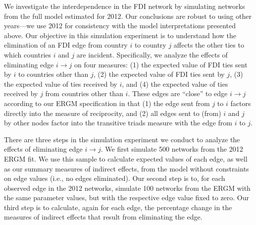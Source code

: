 \documentclass[reqno,onecolumn,letterpaper,12pt]{article}
\begin{document}
We investigate the interdependence in the FDI network by simulating networks from the full model estimated for 2012. Our conclusions are robust to using other years---we use 2012 for consistency with the model interpretations presented above. Our objective in this simulation experiment is to understand how the elimination of an FDI edge from country $i$ to country $j$ affects the other ties to which countries $i$ and $j$ are incident. Specifically, we analyze the effects of eliminating edge $i \rightarrow j$  on four measures: (1) the expected value of FDI ties sent by $i$ to countries other than $j$, (2) the expected value of FDI ties sent by $j$, (3) the expected value of ties received by $i$, and (4) the expected value of ties received by $j$ from countries other than $i$.  These edges are ``close'' to edge $i \rightarrow j$ according to our ERGM specification in that (1) the edge sent from $j$ to $i$ factors directly into the measure of reciprocity, and (2) all edges sent to (from) $i$ and $j$ by other nodes factor into the transitive triads measure with the edge from $i$ to $j$.

There are three steps in the simulation experiment we conduct to analyze the effects of eliminating edge $i \rightarrow j$. We first simulate 500 networks from the 2012 ERGM fit. We use this sample to calculate expected values of each edge, as well as our summary measures of indirect effects, from the model without constraints on edge values (i.e., no edges eliminated). Our second step is to, for each observed edge in the 2012 networks, simulate 100 networks from the ERGM with the same parameter values, but with the respective edge value fixed to zero. Our third step is to calculate, again for each edge, the percentage change in the measures of indirect effects that result from eliminating the edge.
\end{document}
